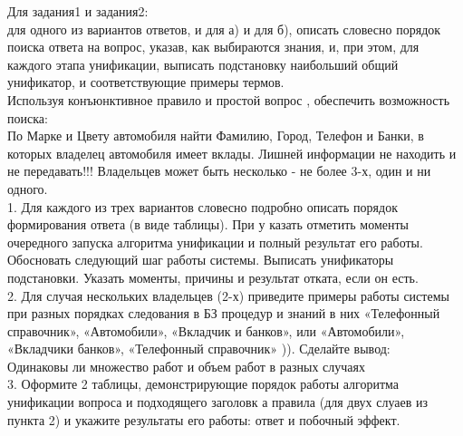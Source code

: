 Для задания1 и задания2:\\
для одного из вариантов ответов, и для а) и для б), описать словесно порядок поиска ответа на вопрос, указав, как выбираются знания, и, при этом, для каждого этапа унификации, выписать подстановку наибольший общий унификатор, и соответствующие примеры термов.\\

Используя конъюнктивное правило и простой вопрос , обеспечить возможность поиска:\\
По Марке и Цвету автомобиля найти Фамилию, Город, Телефон и Банки, в которых владелец автомобиля имеет вклады. Лишней информации не находить и не передавать!!! Владельцев может быть несколько  - не более 3-х, один и ни одного.\\
1. Для каждого из трех вариантов словесно подробно описать порядок формирования ответа (в виде таблицы). При у казать отметить моменты очередного запуска алгоритма унификации и полный результат его работы. Обосновать следующий шаг работы системы. Выписать унификаторы подстановки. Указать моменты, причины и результат отката, если он есть.\\
2. Для случая нескольких владельцев (2-х) приведите примеры работы системы при разных порядках следования в БЗ процедур и знаний в них «Телефонный справочник», «Автомобили», «Вкладчик и банков», или «Автомобили», «Вкладчики банков», «Телефонный справочник» )). Сделайте вывод:\\ Одинаковы ли множество работ и объем работ в разных случаях\\
3. Оформите 2 таблицы, демонстрирующие порядок работы алгоритма унификации вопроса и подходящего заголовк а правила (для двух слуаев из пункта 2) и укажите результаты его работы: ответ и побочный эффект.\\

